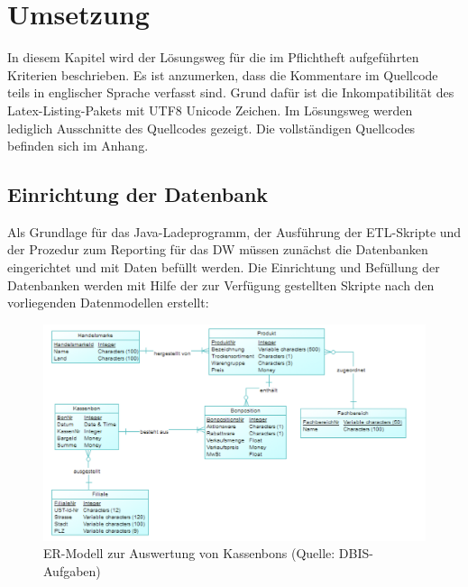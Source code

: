 \section{Umsetzung}

In diesem Kapitel wird der Lösungsweg für die im Pflichtheft aufgeführten Kriterien beschrieben.
Es ist anzumerken, dass die Kommentare im Quellcode teils in englischer Sprache verfasst sind. Grund dafür ist die Inkompatibilität des Latex-Listing-Pakets mit UTF8 Unicode Zeichen. Im Lösungsweg werden lediglich Ausschnitte des Quellcodes gezeigt. Die vollständigen Quellcodes befinden sich im Anhang.

\subsection{Einrichtung der Datenbank}

Als Grundlage für das Java-Ladeprogramm, der Ausführung der ETL-Skripte und der Prozedur zum Reporting für das DW müssen zunächst die Datenbanken eingerichtet und mit Daten befüllt werden. Die Einrichtung und Befüllung der Datenbanken werden mit Hilfe der zur Verfügung gestellten Skripte nach den vorliegenden Datenmodellen erstellt:

\begin{figure}[ht!]
  \centering
  \includegraphics[width=1.2\linewidth]{pictures/db_basic.png}
  \caption[ER-Modell zur Auswertung von Kassenbons]{ER-Modell zur Auswertung von Kassenbons (Quelle: DBIS-Aufgaben)}
\end{figure}


